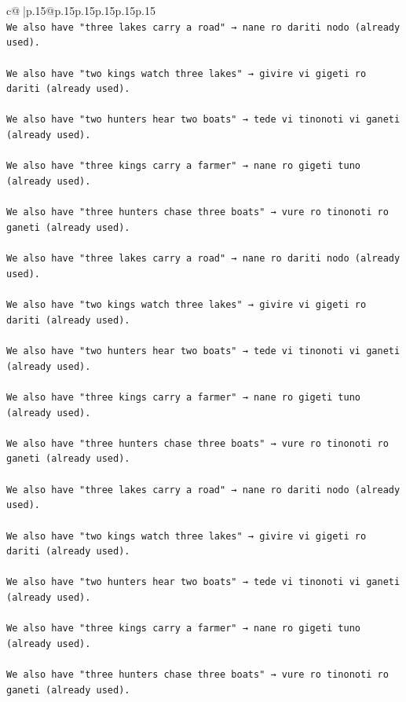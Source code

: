 \documentclass{article}
\begin{document}
{\begin{supertabular}{c@{$\;$}|p{.15\linewidth}@{}p{.15\linewidth}p{.15\linewidth}p{.15\linewidth}p{.15\linewidth}p{.15\linewidth}}
{{{\\ 
\texttt{We also have "three lakes carry a road" → nane ro dariti nodo (already used).} \\
\\ 
\texttt{We also have "two kings watch three lakes" → givire vi gigeti ro dariti (already used).} \\
\\ 
\texttt{We also have "two hunters hear two boats" → tede vi tinonoti vi ganeti (already used).} \\
\\ 
\texttt{We also have "three kings carry a farmer" → nane ro gigeti tuno (already used).} \\
\\ 
\texttt{We also have "three hunters chase three boats" → vure ro tinonoti ro ganeti (already used).} \\
\\ 
\texttt{We also have "three lakes carry a road" → nane ro dariti nodo (already used).} \\
\\ 
\texttt{We also have "two kings watch three lakes" → givire vi gigeti ro dariti (already used).} \\
\\ 
\texttt{We also have "two hunters hear two boats" → tede vi tinonoti vi ganeti (already used).} \\
\\ 
\texttt{We also have "three kings carry a farmer" → nane ro gigeti tuno (already used).} \\
\\ 
\texttt{We also have "three hunters chase three boats" → vure ro tinonoti ro ganeti (already used).} \\
\\ 
\texttt{We also have "three lakes carry a road" → nane ro dariti nodo (already used).} \\
\\ 
\texttt{We also have "two kings watch three lakes" → givire vi gigeti ro dariti (already used).} \\
\\ 
\texttt{We also have "two hunters hear two boats" → tede vi tinonoti vi ganeti (already used).} \\
\\ 
\texttt{We also have "three kings carry a farmer" → nane ro gigeti tuno (already used).} \\
\\ 
\texttt{We also have "three hunters chase three boats" → vure ro tinonoti ro ganeti (already used).} \\
}}}
\end{supertabular}}
\end{document}
